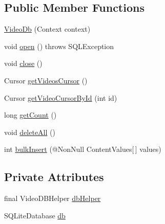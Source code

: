 \subsection*{Public Member Functions}
\begin{DoxyCompactItemize}
\item 
\hyperlink{classorg_1_1buildmlearn_1_1toolkit_1_1videocollectiontemplate_1_1data_1_1VideoDb_a879a547b74bb2e5c08854986d88fe609}{Video\+Db} (Context context)
\item 
void \hyperlink{classorg_1_1buildmlearn_1_1toolkit_1_1videocollectiontemplate_1_1data_1_1VideoDb_a24b0dcb6f8cfe711def7ba88c3bf18a0}{open} ()  throws S\+Q\+L\+Exception 
\item 
void \hyperlink{classorg_1_1buildmlearn_1_1toolkit_1_1videocollectiontemplate_1_1data_1_1VideoDb_a2c2f783ce0cf99a6d792bae422ef9e08}{close} ()
\item 
Cursor \hyperlink{classorg_1_1buildmlearn_1_1toolkit_1_1videocollectiontemplate_1_1data_1_1VideoDb_a927f479a47b78a6eef53401b98dfbb38}{get\+Videos\+Cursor} ()
\item 
Cursor \hyperlink{classorg_1_1buildmlearn_1_1toolkit_1_1videocollectiontemplate_1_1data_1_1VideoDb_a84953834ff3b14a9255e094c9caedd17}{get\+Video\+Cursor\+By\+Id} (int id)
\item 
long \hyperlink{classorg_1_1buildmlearn_1_1toolkit_1_1videocollectiontemplate_1_1data_1_1VideoDb_a326ce91107efcfd17997b33799f0c986}{get\+Count} ()
\item 
void \hyperlink{classorg_1_1buildmlearn_1_1toolkit_1_1videocollectiontemplate_1_1data_1_1VideoDb_aeda2b598acf3f1bd2208fad666457a71}{delete\+All} ()
\item 
int \hyperlink{classorg_1_1buildmlearn_1_1toolkit_1_1videocollectiontemplate_1_1data_1_1VideoDb_adf7a413ac554df6966c4033eab7e628f}{bulk\+Insert} (@Non\+Null Content\+Values\mbox{[}$\,$\mbox{]} values)
\end{DoxyCompactItemize}
\subsection*{Private Attributes}
\begin{DoxyCompactItemize}
\item 
final Video\+D\+B\+Helper \hyperlink{classorg_1_1buildmlearn_1_1toolkit_1_1videocollectiontemplate_1_1data_1_1VideoDb_af8d325e1b90b98559a14d36cd78712bc}{db\+Helper}
\item 
S\+Q\+Lite\+Database \hyperlink{classorg_1_1buildmlearn_1_1toolkit_1_1videocollectiontemplate_1_1data_1_1VideoDb_abd5f6988affdcc87babe147f1be6caab}{db}
\end{DoxyCompactItemize}
